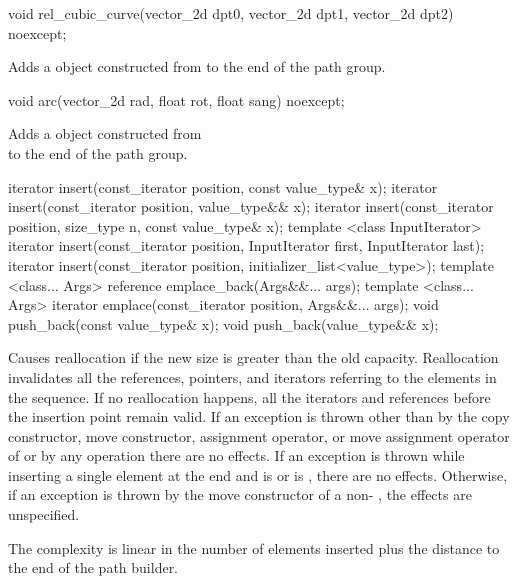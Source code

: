 %
\begin{itemdecl}
void rel_cubic_curve(vector_2d dpt0, vector_2d dpt1,
  vector_2d dpt2) noexcept;
\end{itemdecl}
\begin{itemdescr}
\pnum
\effects
Adds a  object constructed from  to the end of the path group.
\end{itemdescr}

%
\begin{itemdecl}
void arc(vector_2d rad, float rot, float sang) noexcept;
\end{itemdecl}
\begin{itemdescr}
\pnum
\effects
Adds a  object constructed from \\  to the end of the path group.
\end{itemdescr}

%
%
%
\begin{itemdecl}
iterator insert(const_iterator position, const value_type& x);
iterator insert(const_iterator position, value_type&& x);
iterator insert(const_iterator position, size_type n, const value_type& x);
template <class InputIterator>
iterator insert(const_iterator position, InputIterator first,
  InputIterator last);
iterator insert(const_iterator position, initializer_list<value_type>);
template <class... Args>
reference emplace_back(Args&&... args);
template <class... Args>
iterator emplace(const_iterator position, Args&&... args);
void push_back(const value_type& x);
void push_back(value_type&& x);
\end{itemdecl}

\begin{itemdescr}
\pnum
\remarks
Causes reallocation if the new size is greater than the old capacity.
Reallocation invalidates all the references, pointers, and iterators
referring to the elements in the sequence.
If no reallocation happens, all the iterators and references before the insertion point remain valid.
If an exception is thrown other than by
the copy constructor, move constructor,
assignment operator, or move assignment operator of
 or by any  operation
there are no effects.
If an exception is thrown while inserting a single element at the end and
 is  or 
is , there are no effects.
Otherwise, if an exception is thrown by the move constructor of a non-
, the effects are unspecified.

\pnum
\complexity
The complexity is linear in the number of elements inserted plus the 
distance to the end of the path builder.
\end{itemdescr}

